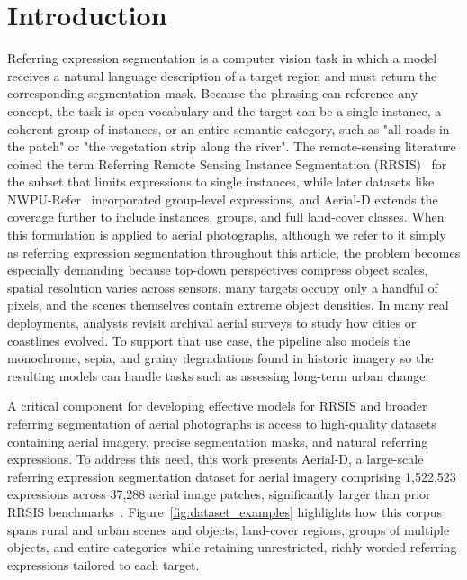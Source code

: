 
\section{Introduction}
\label{sec:intro}

Referring expression segmentation is a computer vision task in which a model receives a natural language description of a target region and must return the corresponding segmentation mask. Because the phrasing can reference any concept, the task is open-vocabulary and the target can be a single instance, a coherent group of instances, or an entire semantic category, such as "all roads in the patch" or "the vegetation strip along the river". The remote-sensing literature coined the term Referring Remote Sensing Instance Segmentation (RRSIS)~\cite{yuan2023rrsis} for the subset that limits expressions to single instances, while later datasets like NWPU-Refer~\cite{yang2024large} incorporated group-level expressions, and Aerial-D extends the coverage further to include instances, groups, and full land-cover classes. When this formulation is applied to aerial photographs, although we refer to it simply as referring expression segmentation throughout this article, the problem becomes especially demanding because top-down perspectives compress object scales, spatial resolution varies across sensors, many targets occupy only a handful of pixels, and the scenes themselves contain extreme object densities. In many real deployments, analysts revisit archival aerial surveys to study how cities or coastlines evolved. To support that use case, the pipeline also models the monochrome, sepia, and grainy degradations found in historic imagery so the resulting models can handle tasks such as assessing long-term urban change.

A critical component for developing effective models for RRSIS and broader referring segmentation of aerial photographs is access to high-quality datasets containing aerial imagery, precise segmentation masks, and natural referring expressions. To address this need, this work presents Aerial-D, a large-scale referring expression segmentation dataset for aerial imagery comprising 1,522,523 expressions across 37,288 aerial image patches, significantly larger than prior RRSIS benchmarks~\cite{yuan2023rrsis,liu2024rotated,yang2024large}. Figure~\ref{fig:dataset_examples} highlights how this corpus spans rural and urban scenes and objects, land-cover regions, groups of multiple objects, and entire categories while retaining unrestricted, richly worded referring expressions tailored to each target.


